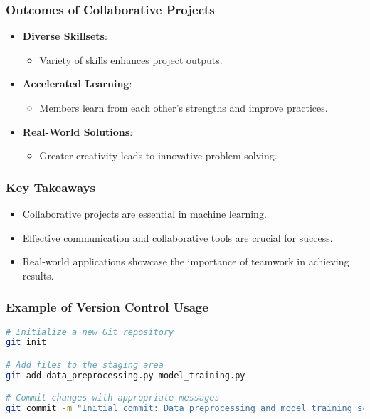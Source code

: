 \documentclass[aspectratio=169]{beamer}
\begin{document}
\begin{frame}
    \frametitle{Outcomes of Collaborative Projects}
    \begin{itemize}
        \item \textbf{Diverse Skillsets}:
            \begin{itemize}
                \item Variety of skills enhances project outputs.
            \end{itemize}
        
        \item \textbf{Accelerated Learning}:
            \begin{itemize}
                \item Members learn from each other’s strengths and improve practices.
            \end{itemize}
        
        \item \textbf{Real-World Solutions}:
            \begin{itemize}
                \item Greater creativity leads to innovative problem-solving.
            \end{itemize}
    \end{itemize}
\end{frame}

\begin{frame}[fragile]
    \frametitle{Key Takeaways}
    \begin{itemize}
        \item Collaborative projects are essential in machine learning.
        \item Effective communication and collaborative tools are crucial for success.
        \item Real-world applications showcase the importance of teamwork in achieving results.
    \end{itemize}
\end{frame}

\begin{frame}[fragile]
    \frametitle{Example of Version Control Usage}
    \begin{lstlisting}[language=bash]
# Initialize a new Git repository
git init

# Add files to the staging area
git add data_preprocessing.py model_training.py

# Commit changes with appropriate messages
git commit -m "Initial commit: Data preprocessing and model training scripts added."
    \end{lstlisting}
\end{frame}
\end{document}
